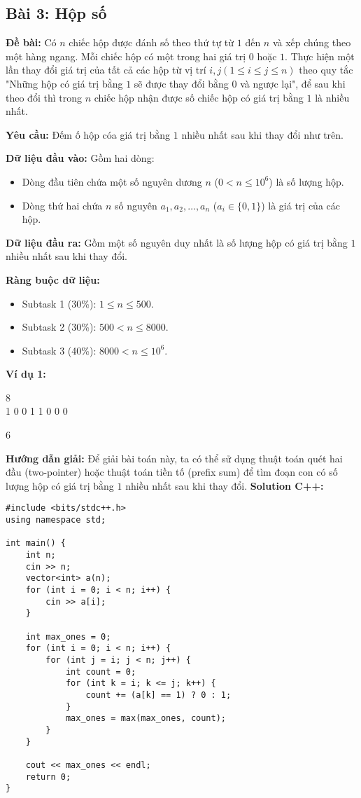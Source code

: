 \documentclass[12pt]{scrartcl}  %
\begin{document}
\subsection{Bài 3: Hộp số}
\textbf{Đề bài:}
Có $n$ chiếc hộp được đánh số theo thứ tự từ $1$ đến $n$ và xếp chúng theo một hàng ngang. Mỗi chiếc hộp 
có một trong hai giá trị $0$ hoặc $1$. Thực hiện một lần thay đổi giá trị của tất cả các hộp từ vị trí $i, j (1 \leq i \leq j \leq n)$ theo quy 
tắc "Những hộp có giá trị bằng $1$ sẽ được thay đổi bằng $0$ và ngược lại", để sau khi theo đổi thì trong $n$ chiếc hộp nhận được số chiếc hộp có giá trị bằng $1$ là nhiều nhất.

\textbf{Yêu cầu:}
Đếm ố hộp cóa giá trị bằng $1$ nhiều nhất sau khi thay đổi như trên.

\textbf{Dữ liệu đầu vào:}
Gồm hai dòng:
\begin{itemize}
    \item Dòng đầu tiên chứa một số nguyên dương $n$ ($0 < n \leq 10^6$) là số lượng hộp.
    \item Dòng thứ hai chứa $n$ số nguyên $a_1, a_2, \ldots, a_n$ ($a_i \in \{0, 1\}$) là giá trị của các hộp.
\end{itemize}

\textbf{Dữ liệu đầu ra:}
Gồm một số nguyên duy nhất là số lượng hộp có giá trị bằng $1$ nhiều nhất sau khi thay đổi.

\textbf{Ràng buộc dữ liệu:}
\begin{itemize}
    \item Subtask 1 (30\%): $1 \leq n \leq 500$.
    \item Subtask 2 (30\%): $500 < n \leq 8000$.
    \item Subtask 3 (40\%): $8000 < n \leq 10^6$.
\end{itemize}

\textbf{Ví dụ 1:}
\begin{tcolorbox}[colback=gray!5!white, colframe=blue!50!black, title=Input]
8\\
1 0 0 1 1 0 0 0
\end{tcolorbox}
\begin{tcolorbox}[colback=gray!5!white, colframe=green!50!black, title=Output]
6
\end{tcolorbox}

\textbf{Hướng dẫn giải:}
Để giải bài toán này, ta có thể sử dụng thuật toán quét hai đầu (two-pointer) hoặc thuật toán tiền tố (prefix sum) để tìm đoạn con có số lượng hộp có giá trị bằng $1$ nhiều nhất sau khi thay đổi.
\textbf{Solution C++:}
\begin{lstlisting}
#include <bits/stdc++.h>
using namespace std;

int main() {
    int n;
    cin >> n;
    vector<int> a(n);
    for (int i = 0; i < n; i++) {
        cin >> a[i];
    }

    int max_ones = 0;
    for (int i = 0; i < n; i++) {
        for (int j = i; j < n; j++) {
            int count = 0;
            for (int k = i; k <= j; k++) {
                count += (a[k] == 1) ? 0 : 1;
            }
            max_ones = max(max_ones, count);
        }
    }

    cout << max_ones << endl;
    return 0;
}
\end{lstlisting}
\end{document}
